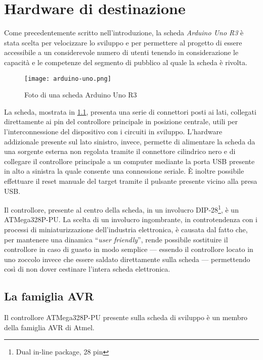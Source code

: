 \chapter{Hardware di destinazione}
    
Come precedentemente scritto nell'introduzione, la scheda \textit{Arduino Uno R3} è stata scelta per velocizzare lo sviluppo e per permettere al progetto di essere accessibile a un considerevole numero di utenti tenendo in considerazione le capacità e le competenze del segmento di pubblico al quale la scheda è rivolta.

\begin{figure}[b]
    \centering
    \texttt{[image: arduino-uno.png]}
    \caption[]{Foto di una scheda Arduino Uno R3\cite{img:arduino-uno-r3}}\label{fig:arduino-uno-r3}
\end{figure}

La scheda, mostrata in \cref{fig:arduino-uno-r3}, presenta una serie di connettori posti ai lati, collegati direttamente ai pin del controllore principale in posizione centrale, utili per l'interconnessione del dispositivo con i circuiti in sviluppo.
L'hardware addizionale presente sul lato sinistro, invece, permette di alimentare la scheda da una sorgente esterna non regolata tramite il connettore cilindrico nero e di collegare il controllore principale a un computer mediante la porta USB presente in alto a sinistra la quale consente una connessione seriale.
È inoltre possibile effettuare il reset manuale del target tramite il pulsante presente vicino alla presa USB.\@

Il controllore, presente al centro della scheda, in un involucro DIP-28\footnote{Dual in-line package, 28 pin}, è un ATMega328P-PU\cite{site:arduino-uno-doc}. La scelta di un involucro ingombrante, in controtendenza con i processi di miniaturizzazione dell'industria elettronica, è causata dal fatto che, per mantenere una dinamica ``\textit{user friendly}'', rende possibile sostituire il controllore in caso di guasto in modo semplice --- essendo il controllore locato in uno zoccolo invece che essere saldato direttamente sulla scheda --- permettendo così di non dover cestinare l'intera scheda elettronica.\cite{site:arduino-uno-doc}

\section{La famiglia AVR}

Il controllore ATMega328P-PU presente sulla scheda di sviluppo è un membro della famiglia AVR di Atmel\cite[1]{avr:m328p}.


